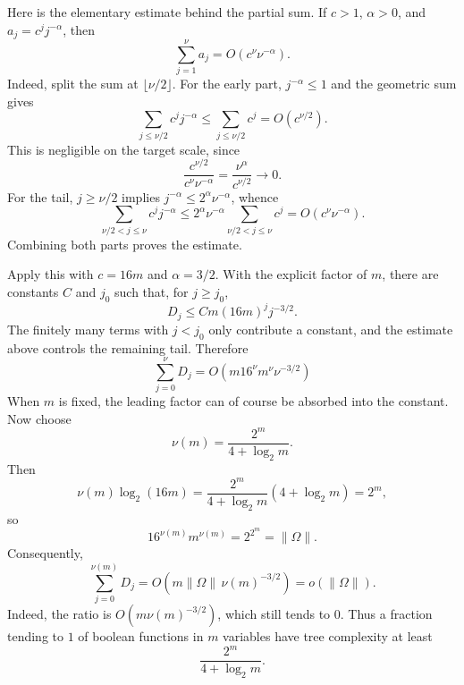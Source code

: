 Here is the elementary estimate behind the partial sum. If $c > 1$, $\alpha > 0$, and
$a_{j} = c^{j}j^{-\alpha}$, then
\begin{equation*}
    \sum_{j = 1}^{\nu} a_{j} = O(c^{\nu}\nu^{-\alpha}).
\end{equation*}
Indeed, split the sum at $\lfloor \nu/2 \rfloor$. For the early part, $j^{-\alpha} \leq 1$ and
the geometric sum gives
\begin{equation*}
    \sum_{j \leq \nu/2} c^{j}j^{-\alpha}
        \leq \sum_{j \leq \nu/2} c^{j}
        = O(c^{\nu/2}).
\end{equation*}
This is negligible on the target scale, since
\begin{equation*}
    \frac{c^{\nu/2}}{c^{\nu}\nu^{-\alpha}}
        = \frac{\nu^{\alpha}}{c^{\nu/2}} \longrightarrow 0.
\end{equation*}
For the tail, $j \geq \nu/2$ implies $j^{-\alpha} \leq 2^{\alpha}\nu^{-\alpha}$, whence
\begin{equation*}
    \sum_{\nu/2 < j \leq \nu} c^{j}j^{-\alpha}
        \leq 2^{\alpha}\nu^{-\alpha}\sum_{\nu/2 < j \leq \nu} c^{j}
        = O(c^{\nu}\nu^{-\alpha}).
\end{equation*}
Combining both parts proves the estimate.

Apply this with $c = 16m$ and $\alpha = 3/2$. With the explicit factor of $m$, there are
constants $C$ and $j_{0}$ such that, for $j \geq j_{0}$,
\[
    D_{j} \leq Cm(16m)^{j}j^{-3/2}.
\]
The finitely many terms with $j < j_{0}$ only contribute a constant, and the estimate above
controls the remaining tail. Therefore
\begin{equation*}
    \sum_{j = 0}^{\nu}D_{j} = O(m16^{\nu}m^{\nu}\nu^{-3/2})
\end{equation*}
When $m$ is fixed, the leading factor can of course be absorbed into the constant. Now choose
\begin{equation*}
    \nu(m) = \frac{2^{m}}{4 + \log_{2}m}.
\end{equation*}
Then
\begin{equation*}
    \nu(m)\log_{2}(16m)
        = \frac{2^{m}}{4 + \log_{2}m}(4 + \log_{2}m)
        = 2^{m},
\end{equation*}
so
\begin{equation*}
    16^{\nu(m)}m^{\nu(m)} = 2^{2^{m}} = \lVert \Omega \rVert.
\end{equation*}
Consequently,
\begin{equation*}
    \sum_{j = 0}^{\nu(m)}D_{j}
        = O(m\lVert \Omega \rVert\,\nu(m)^{-3/2})
        = o(\lVert \Omega \rVert).
\end{equation*}
Indeed, the ratio is $O(m\nu(m)^{-3/2})$, which still tends to $0$.
Thus a fraction tending to $1$ of boolean functions in $m$ variables have tree complexity at
least
\begin{equation*}
    \frac{2^{m}}{4 + \log_{2}m}.
\end{equation*}

